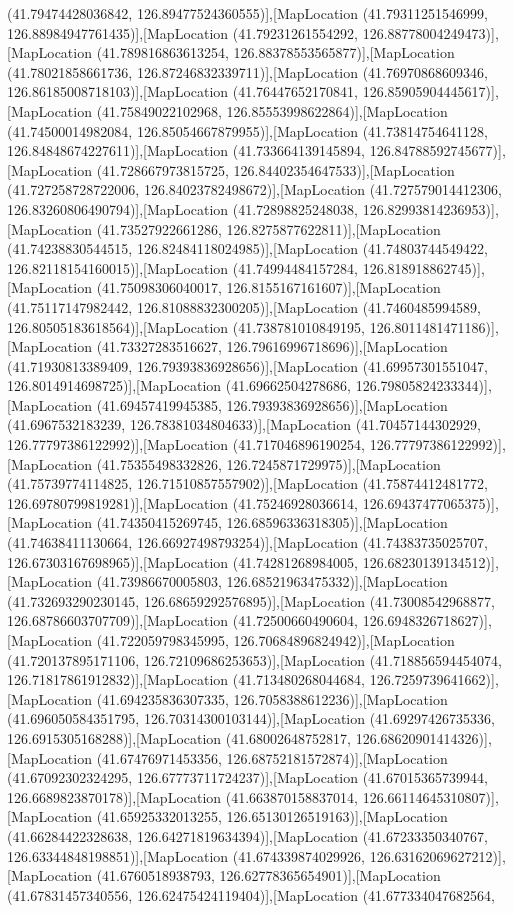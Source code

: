 (41.79474428036842, 126.89477524360555)],[MapLocation (41.79311251546999, 126.88984947761435)],[MapLocation (41.79231261554292, 126.88778004249473)],[MapLocation (41.789816863613254, 126.88378553565877)],[MapLocation (41.78021858661736, 126.87246832339711)],[MapLocation (41.76970868609346, 126.86185008718103)],[MapLocation (41.76447652170841, 126.85905904445617)],[MapLocation (41.75849022102968, 126.85553998622864)],[MapLocation (41.74500014982084, 126.85054667879955)],[MapLocation (41.73814754641128, 126.84848674227611)],[MapLocation (41.733664139145894, 126.84788592745677)],[MapLocation (41.728667973815725, 126.84402354647533)],[MapLocation (41.727258728722006, 126.84023782498672)],[MapLocation (41.727579014412306, 126.83260806490794)],[MapLocation (41.72898825248038, 126.82993814236953)],[MapLocation (41.73527922661286, 126.8275877622811)],[MapLocation (41.74238830544515, 126.82484118024985)],[MapLocation (41.74803744549422, 126.82118154160015)],[MapLocation (41.74994484157284, 126.818918862745)],[MapLocation (41.75098306040017, 126.8155167161607)],[MapLocation (41.75117147982442, 126.81088832300205)],[MapLocation (41.7460485994589, 126.80505183618564)],[MapLocation (41.738781010849195, 126.8011481471186)],[MapLocation (41.73327283516627, 126.79616996718696)],[MapLocation (41.71930813389409, 126.79393836928656)],[MapLocation (41.69957301551047, 126.8014914698725)],[MapLocation (41.69662504278686, 126.79805824233344)],[MapLocation (41.69457419945385, 126.79393836928656)],[MapLocation (41.6967532183239, 126.78381034804633)],[MapLocation (41.70457144302929, 126.77797386122992)],[MapLocation (41.717046896190254, 126.77797386122992)],[MapLocation (41.75355498332826, 126.7245871729975)],[MapLocation (41.75739774114825, 126.71510857557902)],[MapLocation (41.75874412481772, 126.69780799819281)],[MapLocation (41.75246928036614, 126.69437477065375)],[MapLocation (41.74350415269745, 126.68596336318305)],[MapLocation (41.74638411130664, 126.66927498793254)],[MapLocation (41.74383735025707, 126.67303167698965)],[MapLocation (41.74281268984005, 126.68230139134512)],[MapLocation (41.73986670005803, 126.68521963475332)],[MapLocation (41.732693290230145, 126.68659292576895)],[MapLocation (41.73008542968877, 126.68786603707709)],[MapLocation (41.72500660490604, 126.6948326718627)],[MapLocation (41.722059798345995, 126.70684896824942)],[MapLocation (41.720137895171106, 126.72109686253653)],[MapLocation (41.718856594454074, 126.71817861912832)],[MapLocation (41.713480268044684, 126.7259739641662)],[MapLocation (41.694235836307335, 126.7058388612236)],[MapLocation (41.696050584351795, 126.70314300103144)],[MapLocation (41.69297426735336, 126.6915305168288)],[MapLocation (41.68002648752817, 126.68620901414326)],[MapLocation (41.67476971453356, 126.68752181572874)],[MapLocation (41.67092302324295, 126.67773711724237)],[MapLocation (41.67015365739944, 126.6689823870178)],[MapLocation (41.663870158837014, 126.66114645310807)],[MapLocation (41.65925332013255, 126.65130126519163)],[MapLocation (41.66284422328638, 126.64271819634394)],[MapLocation (41.67233350340767, 126.63344848198851)],[MapLocation (41.674339874029926, 126.63162069627212)],[MapLocation (41.6760518938793, 126.62778365654901)],[MapLocation (41.67831457340556, 126.62475424119404)],[MapLocation (41.677334047682564, 